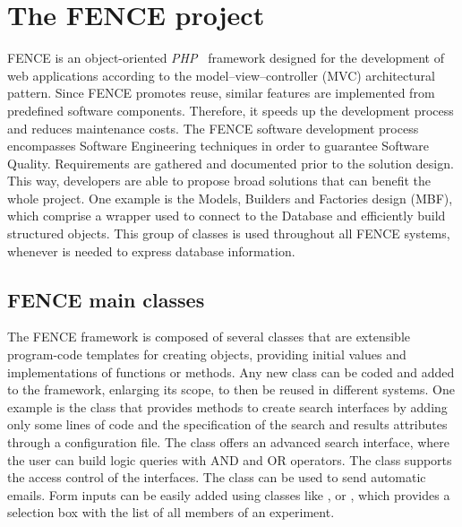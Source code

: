 
\section{The FENCE project}%
\label{sec:The_FENCE_project}

FENCE is an object-oriented \textit{PHP}~\cite{php} framework designed for the development of web applications according to the model–view–controller (MVC) architectural pattern.
Since FENCE promotes reuse, similar features are implemented from predefined software components.
Therefore, it speeds up the development process and reduces maintenance costs.
The FENCE software development process encompasses Software Engineering techniques in order to guarantee Software Quality. Requirements are gathered and documented prior to the solution design.
This way, developers are able to propose broad solutions that can benefit the whole project.
One example is the Models, Builders and Factories design (MBF), which comprise a wrapper used to connect to the Database and efficiently build structured objects.
This group of classes is used throughout all FENCE systems, whenever is needed to express database information.


\subsection{FENCE main classes}%
\label{sec:FENCE_main_classes}

The FENCE framework is composed of several classes that are extensible program-code templates for creating objects, providing initial values and implementations of functions or methods.
Any new class can be coded and added to the framework, enlarging its scope, to then be reused in different systems.
One example is the  class that provides methods to create search interfaces by adding only some lines of code and the specification of the search and results attributes through a configuration file.
The  class offers an advanced search interface, where the user can build logic queries with AND and OR operators.
The  class supports the access control of the interfaces.
The  class can be used to send automatic emails.
Form inputs can be easily added using classes like ,  or , which provides a selection box with the list of all members of an experiment.
                    
